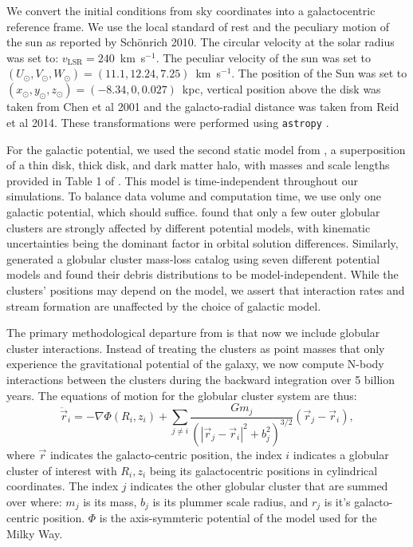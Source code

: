 \documentclass{aa}
\begin{document}
    We convert the initial conditions from sky coordinates into a galactocentric reference frame. We use the local standard of rest and the peculiary motion of the sun as reported by Sch\"onrich 2010. The circular velocity at the solar radius was set to: $v_{\text{LSR}} = 240$~km~s$^{-1}$. The peculiar velocity of the sun was set to $(U_\odot, V_\odot, W_\odot)=(11.1, 12.24, 7.25)$~km~s$^{-1}$. The position of the Sun was set to $(x_\odot,y_\odot,z_\odot) = (-8.34,0,0.027)$~kpc, vertical position above the disk was taken from Chen et al 2001 and the galacto-radial distance was taken from Reid et al 2014. These transformations were performed using \texttt{astropy} \citep{2013A&A...558A..33A}.


    For the galactic potential, we used the second static model from \citet{2017A&A...598A..66P}, a superposition of a thin disk, thick disk, and dark matter halo, with masses and scale lengths provided in Table 1 of \citet{2023A&A...673A..44F}. This model is time-independent throughout our simulations. To balance data volume and computation time, we use only one galactic potential, which should suffice. \citet{2021MNRAS.505.5978V} found that only a few outer globular clusters are strongly affected by different potential models, with kinematic uncertainties being the dominant factor in orbital solution differences. Similarly, \citet{2024MNRAS.528.5189G} generated a globular cluster mass-loss catalog using seven different potential models and found their debris distributions to be model-independent. While the clusters' positions may depend on the model, we assert that interaction rates and stream formation are unaffected by the choice of galactic model.    

    The primary methodological departure from \citet{2023A&A...673A..44F} is that now we include globular cluster interactions. Instead of treating the clusters as point masses that only experience the gravitational potential of the galaxy, we now compute N-body interactions between the clusters during the backward integration over 5 billion years. The equations of motion for the globular cluster system are thus: 
    \begin{equation}
      \ddot{\vec{r}}_i = -\nabla \Phi(R_i,z_i) + \left.\sum_{j\neq i} \frac{Gm_j}{\left(|\vec{r}_j - \vec{r}_i|^2 + b_j^2\right)^{3/2}}\right. \left(\vec{r}_j - \vec{r}_i\right),
    \end{equation}\label{eq:GCNBody} where $\vec{r}$ indicates the galacto-centric position, the index $i$ indicates a globular cluster of interest with $R_i,z_i$ being its galactocentric positions in cylindrical coordinates. The index $j$ indicates the other globular cluster that are summed over where: $m_j$ is its mass, $b_j$ is its plummer scale radius, and $r_j$ is it's galacto-centric position. $\Phi$ is the axis-symmteric potential of the model used for the Milky Way. 
\end{document}
